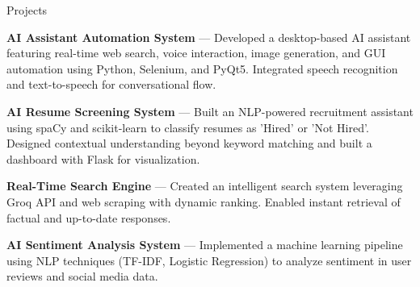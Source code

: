 \documentclass{resume}
\begin{document}

\begin{rSection}{Projects}

\item \textbf{AI Assistant Automation System} — Developed a desktop-based AI assistant featuring real-time web search, voice interaction, image generation, and GUI automation using Python, Selenium, and PyQt5. Integrated speech recognition and text-to-speech for conversational flow.

\item \textbf{AI Resume Screening System} — Built an NLP-powered recruitment assistant using spaCy and scikit-learn to classify resumes as 'Hired' or 'Not Hired'. Designed contextual understanding beyond keyword matching and built a dashboard with Flask for visualization.

\item \textbf{Real-Time Search Engine} — Created an intelligent search system leveraging Groq API and web scraping with dynamic ranking. Enabled instant retrieval of factual and up-to-date responses.

\item \textbf{AI Sentiment Analysis System} — Implemented a machine learning pipeline using NLP techniques (TF-IDF, Logistic Regression) to analyze sentiment in user reviews and social media data.

\end{rSection}

\end{document}
